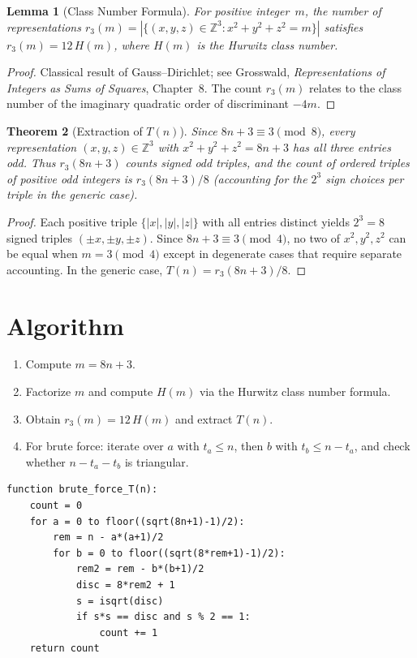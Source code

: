 \documentclass[11pt]{article}
\newtheorem{theorem}{Theorem}
\newtheorem{lemma}[theorem]{Lemma}
\begin{document}
\begin{lemma}[Class Number Formula]
\label{lem:class}
For positive integer~$m$, the number of representations $r_3(m) = |\{(x,y,z) \in \mathbb{Z}^3 : x^2+y^2+z^2 = m\}|$ satisfies $r_3(m) = 12\,H(m)$, where $H(m)$ is the Hurwitz class number.
\end{lemma}

\begin{proof}
Classical result of Gauss--Dirichlet; see Grosswald, \textit{Representations of Integers as Sums of Squares}, Chapter~8. The count $r_3(m)$ relates to the class number of the imaginary quadratic order of discriminant $-4m$.
\end{proof}

\begin{theorem}[Extraction of $T(n)$]
Since $8n+3 \equiv 3 \pmod{8}$, every representation $(x,y,z) \in \mathbb{Z}^3$ with $x^2+y^2+z^2 = 8n+3$ has all three entries odd. Thus $r_3(8n+3)$ counts signed odd triples, and the count of ordered triples of positive odd integers is $r_3(8n+3)/8$ (accounting for the $2^3$ sign choices per triple in the generic case).
\end{theorem}

\begin{proof}
Each positive triple $\{|x|,|y|,|z|\}$ with all entries distinct yields $2^3 = 8$ signed triples $(\pm x, \pm y, \pm z)$. Since $8n+3 \equiv 3 \pmod{4}$, no two of $x^2, y^2, z^2$ can be equal when $m = 3 \pmod{4}$ except in degenerate cases that require separate accounting. In the generic case, $T(n) = r_3(8n+3)/8$.
\end{proof}

\section{Algorithm}

\begin{enumerate}
\item Compute $m = 8n + 3$.
\item Factorize $m$ and compute $H(m)$ via the Hurwitz class number formula.
\item Obtain $r_3(m) = 12\,H(m)$ and extract $T(n)$.
\item For brute force: iterate over $a$ with $t_a \le n$, then $b$ with $t_b \le n - t_a$, and check whether $n - t_a - t_b$ is triangular.
\end{enumerate}

\begin{verbatim}
function brute_force_T(n):
    count = 0
    for a = 0 to floor((sqrt(8n+1)-1)/2):
        rem = n - a*(a+1)/2
        for b = 0 to floor((sqrt(8*rem+1)-1)/2):
            rem2 = rem - b*(b+1)/2
            disc = 8*rem2 + 1
            s = isqrt(disc)
            if s*s == disc and s % 2 == 1:
                count += 1
    return count
\end{verbatim}
\end{document}
